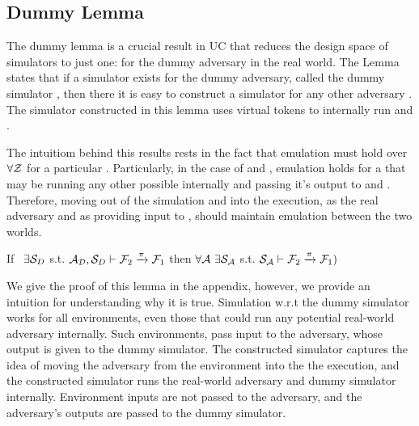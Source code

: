 \subsection{Dummy Lemma} \label{sec:dummy}
The dummy lemma is a crucial result in UC that reduces the design space of simulators to just one: for the dummy adversary in the real world.
The Lemma states that if a simulator exists for the dummy adversary, called the dummy simulator \DS, then there it is easy to construct a simulator for any other adversary \A. 
The simulator constructed in this lemma uses virtual tokens to internally run \DS and \A.

The intuitiom behind this results rests in the fact that emulation must hold over $\forall \mathcal{Z}$ for a particular \A. 
Particularly, in the case of \DS and \DummyAdv, emulation holds for a \Z that may be running any other possible \A internally and passing it's output to \DS and \DummyAdv.
Therefore, moving \A out of the simulation and into the execution, as the real adversary and as providing input to \DS, should maintain emulation between the two worlds.

\begin{theorem}\label{thm:dummy}
If \ $\exists \mathcal{S}_{D}$ s.t. $ \mathcal{A}_\mathcal{D}, \mathcal{S}_{D} \vdash \mathcal{F}_2 \xrightarrow{\pi} \mathcal{F}_1$ then $\forall \mathcal{A} \ \exists \mathcal{S}_\mathcal{A}$ s.t. $\mathcal{S}_{\mathcal{A}} \vdash  \mathcal{F}_2 \xrightarrow{\pi} \mathcal{F}_1)$ 
\end{theorem}

We give the proof of this lemma in the appendix, however, we provide an intuition for understanding why it is true.
Simulation w.r.t the dummy simulator works for all environments, even those that could run any potential real-world adversary internally. Such environments, pass input to the adversary, whose output is given to the dummy simulator. 
The constructed simulator captures the idea of moving the adversary from the environment into the the execution, and the constructed simulator runs the real-world adversary and dummy simulator internally.
Environment inputs are not passed to the adversary, and the adversary's outputs are passed to the dummy simulator.

